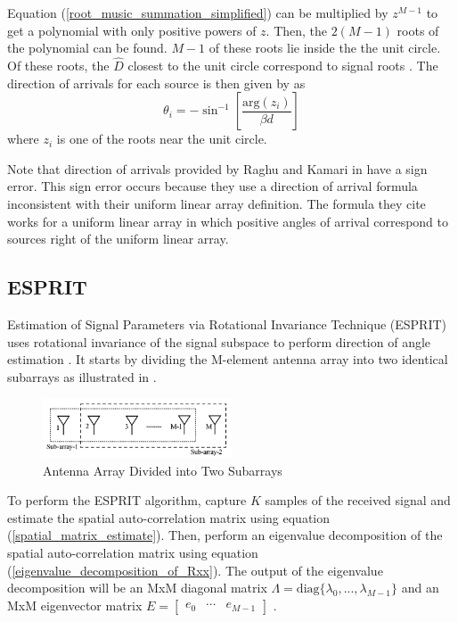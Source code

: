 \documentclass[conference]{IEEEtran}
\begin{document}
		Equation (\ref{root_music_summation_simplified}) can be multiplied by $z^{M-1}$ to get a polynomial with only positive powers of $z$. Then, the $2(M-1)$ roots of the polynomial can be found. $M - 1$ of these roots lie inside the the unit circle. Of these roots, the $\hat{D}$ closest to the unit circle correspond to signal roots \cite{root_music_eskandari}. The direction of arrivals for each source is then given by \cite{root_music_esprit_patwari} as 
		\begin{equation}
			\theta_i = -\sin^{-1}\left[\frac{\text{arg}(z_i)}{{\beta}d}\right]
		\end{equation}
		where $z_i$ is one of the roots near the unit circle.
		
			Note that direction of arrivals provided by Raghu and Kamari in \cite{doa_algorithms_raghu} have a sign error. This sign error occurs because they use a direction of arrival formula inconsistent with their uniform linear array definition. The formula they cite works for a uniform linear array in which positive angles of arrival correspond to sources right of the uniform linear array.
		
	\subsection{ESPRIT}
		
		Estimation of Signal Parameters via Rotational Invariance Technique (ESPRIT) uses rotational invariance of the signal subspace to perform direction of angle estimation \cite{root_music_ko}. It starts by dividing the M-element antenna array into two identical subarrays as illustrated in \cite{doa_algorithms_raghu}.
		
		\begin{figure}[H]
			\centerline{\includegraphics[width=0.5\textwidth]{esprit_doublets.png}}
			\caption{Antenna Array Divided into Two Subarrays \cite{doa_algorithms_raghu}}
			\label{fig::esprit_subarrays}
		\end{figure}
		
		To perform the ESPRIT algorithm, capture $K$ samples of the received signal and estimate the spatial auto-correlation matrix using equation (\ref{spatial_matrix_estimate}). Then, perform an eigenvalue decomposition of the spatial auto-correlation matrix using equation (\ref{eigenvalue_decomposition_of_Rxx}). The output of the eigenvalue decomposition will be an MxM diagonal matrix $\Lambda = \text{diag}\{\lambda_0, ..., \lambda_{M-1}\}$ and an MxM eigenvector matrix $E = \begin{bmatrix}e_0 & \cdots & e_{M-1}\end{bmatrix}$ \cite{doa_algorithms_raghu}. 
		
\end{document}
